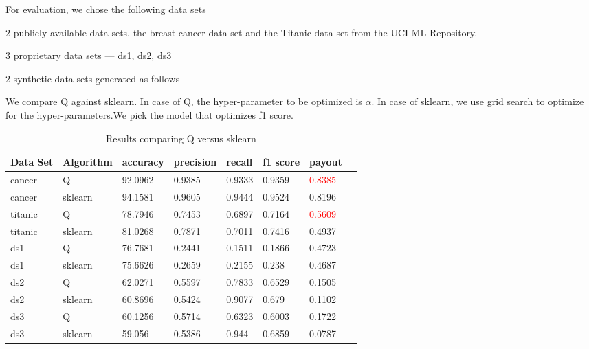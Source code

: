 For evaluation, we chose the following data sets
\be
\item 2 publicly available data sets, the breast cancer data set and the
Titanic data set from the UCI ML Repository.
\item 3 proprietary data sets --- ds1, ds2, ds3
\item 2 synthetic data sets generated as follows
\be
\item \TBC
\item \TBC
\ee
\ee

We compare Q against sklearn. 
In case of Q, the hyper-parameter to be optimized is \(\alpha\). 
In case of sklearn, we use grid search to optimize for the hyper-parameters.We
pick the model that optimizes f1 score. 

\begin{table}
\centering
\begin{tabular}{|l||l|l|l|l|l|l|l|} \hline \hline
{\bf Data Set} & {\bf Algorithm} & {\bf accuracy} & {\bf precision} & {\bf recall} & {\bf f1 score} & {\bf payout} \\ \hline \hline    
cancer & Q &      92.0962 & 0.9385 &  0.9333 &  0.9359 &  \textcolor{red}{0.8385} \\ \hline
cancer & sklearn & 94.1581 & 0.9605 &  0.9444 &  0.9524 &  0.8196 \\ \hline
\hline                                        
titanic & Q &      78.7946 & 0.7453 &  0.6897 &  0.7164 &  \textcolor{red}{0.5609} \\ \hline
titanic & sklearn &       81.0268 & 0.7871 &  0.7011 &  0.7416 &  0.4937 \\ \hline
\hline                                        
ds1 & Q &    76.7681 &0.2441  &0.1511  & 0.1866  & 0.4723 \\ \hline
ds1 &  sklearn &     75.6626 & 0.2659 &  0.2155 &  0.238 &   0.4687 \\ \hline
\hline                                        
ds2 & Q &     62.0271 & 0.5597 &  0.7833 &  0.6529 &  0.1505 \\ \hline
ds2 & sklearn &     60.8696 & 0.5424 &  0.9077 &  0.679 &   0.1102 \\ \hline
\hline                                        
ds3 & Q &   60.1256 & 0.5714 &  0.6323 &  0.6003 &  0.1722 \\ \hline
ds3 & sklearn &   59.056 &  0.5386 &  0.944 &   0.6859 &  0.0787 \\ \hline
\hline
\end{tabular}
\label{tbl_results}
\caption{Results comparing Q versus sklearn}
\end{table}

